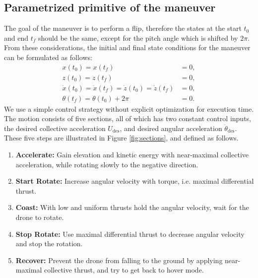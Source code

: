 \subsection{Parametrized primitive of the maneuver}\label{sec:sections}
The goal of the maneuver is to perform a flip, therefore the states at the start $t_0$ and end $t_f$ should be the same, except for the pitch angle which is shifted by $2\pi$. From these considerations, the initial and final state conditions for the maneuver can be formulated as follows:
\begin{subequations}
\begin{align}
x(t_0) = x(t_f) &= 0,\\
z(t_0) = z(t_f) &= 0,\\
\dot{x}(t_0) = \dot{x}(t_f) = \dot{z}(t_0) = \dot{z}(t_f) &= 0,\\
\theta(t_f) = \theta(t_0) + 2\pi &= 0.
\end{align}
\end{subequations}
We use a simple control strategy without explicit optimization for execution time. %
The motion consists of five sections, all of which has two constant control inputs, the desired collective acceleration $U_\mathrm{des}$, and desired angular acceleration $\ddot{\theta}_\mathrm{des}$. These five steps are illustrated in Figure \ref{fig:sections}, and defined as follows.

\renewcommand{\baselinestretch}{1}\normalsize 
\begin{enumerate}[itemsep=0mm]
\item \textbf{Accelerate:} Gain elevation and kinetic energy with near-maximal collective acceleration, while rotating slowly to the negative direction.
\item \textbf{Start Rotate:} Increase angular velocity with torque, i.e. maximal differential thrust.
\item \textbf{Coast:} With low and uniform thrusts hold the angular velocity, wait for the drone to rotate.
\item \textbf{Stop Rotate:} Use maximal differential thrust to decrease angular velocity and stop the rotation.
\item \textbf{Recover:} Prevent the drone from falling to the ground by applying near-maximal collective thrust, and try to get back to hover mode.
\end{enumerate}

